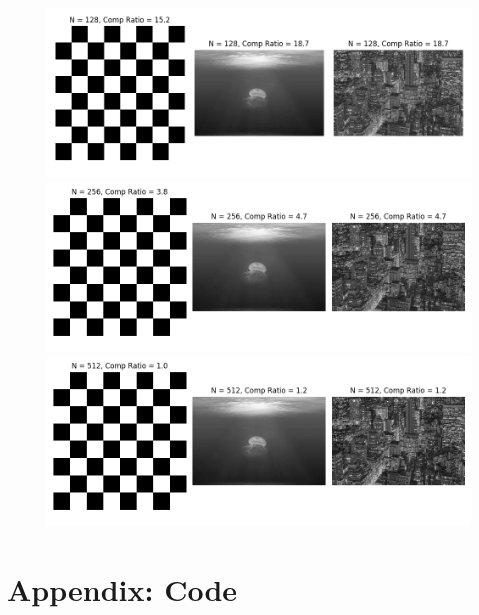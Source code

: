 \documentclass[12p,a4paper]{article}
\begin{document}
\begin{figure}[H]
    \centering
    \includegraphics[width=1.0\linewidth]{../figs/img6.png}
    \includegraphics[width=1.0\linewidth]{../figs/img7.png}
    \includegraphics[width=1.0\linewidth]{../figs/img8.png}
\end{figure}


\section*{Appendix: Code}

\pagebreak


\end{document}
